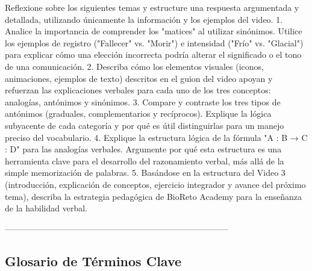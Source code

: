 \documentclass[a4paper,12pt]{ctexart}
\begin{document}
Reflexione sobre los siguientes temas y estructure una respuesta argumentada y detallada, utilizando únicamente la información y los ejemplos del video.
1. Analice la importancia de comprender los "matices" al utilizar sinónimos. Utilice los ejemplos de registro ("Fallecer" vs. "Morir") e intensidad ("Frío" vs. "Glacial") para explicar cómo una elección incorrecta podría alterar el significado o el tono de una comunicación.
2. Describa cómo los elementos visuales (iconos, animaciones, ejemplos de texto) descritos en el guion del video apoyan y refuerzan las explicaciones verbales para cada uno de los tres conceptos: analogías, antónimos y sinónimos.
3. Compare y contraste los tres tipos de antónimos (graduales, complementarios y recíprocos). Explique la lógica subyacente de cada categoría y por qué es útil distinguirlas para un manejo preciso del vocabulario.
4. Explique la estructura lógica de la fórmula "A : B → C : D" para las analogías verbales. Argumente por qué esta estructura es una herramienta clave para el desarrollo del razonamiento verbal, más allá de la simple memorización de palabras.
5. Basándose en la estructura del Video 3 (introducción, explicación de conceptos, ejercicio integrador y avance del próximo tema), describa la estrategia pedagógica de BioReto Academy para la enseñanza de la habilidad verbal.

--------------------------------------------------------------------------------

\subsection{Glosario de Términos Clave}
\end{document}
